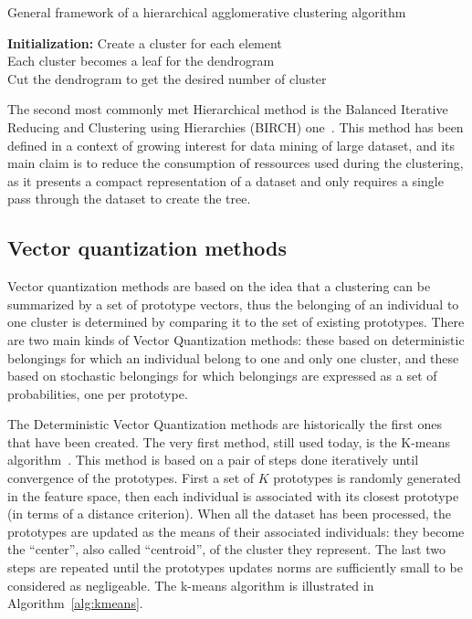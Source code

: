     \begin{algorithm}[H]
        \caption{General framework of a hierarchical agglomerative clustering algorithm}
        \textbf{Initialization:} Create a cluster for each element\\
        Each cluster becomes a leaf for the dendrogram\\
        Cut the dendrogram to get the desired number of cluster
\label{alg:hierarch}
    \end{algorithm}

    \vspace{0.8cm}

    The second most commonly met Hierarchical method is the Balanced Iterative Reducing and Clustering using Hierarchies (BIRCH) one~\cite{zhang1997birch}. This method has been defined in a context of growing interest for data mining of large dataset, and its main claim is to reduce the consumption of ressources used during the clustering, as it presents a compact representation of a dataset and only requires a single pass through the dataset to create the tree.

    \subsection{Vector quantization methods}
\label{sec:cluster_vector_quantization}

    Vector quantization methods are based on the idea that a clustering can be summarized by a set of prototype vectors, thus the belonging of an individual to one cluster is determined by comparing it to the set of existing prototypes. There are two main kinds of Vector Quantization methods: these based on deterministic belongings for which an individual belong to one and only one cluster, and these based on stochastic belongings for which belongings are expressed as a set of probabilities, one per prototype. 

    The Deterministic Vector Quantization methods are historically the first ones that have been created. The very first method, still used today, is the K-means algorithm~\cite{macqueen1967some}. This method is based on a pair of steps done iteratively until convergence of the prototypes. First a set of $K$ prototypes is randomly generated in the feature space, then each individual is associated with its closest prototype (in terms of a distance criterion). When all the dataset has been processed, the prototypes are updated as the means of their associated individuals: they become the ``center'', also called ``centroid'',  of the cluster they represent. The last two steps are repeated until the prototypes updates norms are sufficiently small to be considered as negligeable. The k-means algorithm is illustrated in Algorithm~\ref{alg:kmeans}.

